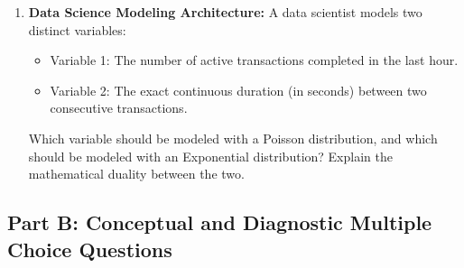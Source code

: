 \begin{enumerate}
    \item \textbf{Data Science Modeling Architecture:} A data scientist models two distinct variables:
    \begin{itemize}
        \item Variable 1: The number of active transactions completed in the last hour.
        \item Variable 2: The exact continuous duration (in seconds) between two consecutive transactions.
    \end{itemize}
    Which variable should be modeled with a Poisson distribution, and which should be modeled with an Exponential distribution? Explain the mathematical duality between the two.
\end{enumerate}

\subsection*{Part B: Conceptual and Diagnostic Multiple Choice Questions}

